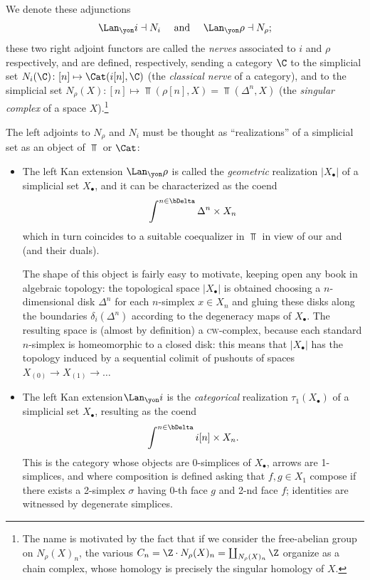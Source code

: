 We denote these adjunctions
\[
\Lan_\yon i\dashv N_i \quad\text{ and }\quad \Lan_\yon \rho\dashv N_\rho;
\] 
these two right adjoint functors are called the \emph{nerves} associated to $i$ and $\rho$ respectively, and are defined, respectively, sending a category $\C$ to the simplicial set $N_i(\C)\colon [n]\mapsto \Cat(i[n],\C)$ (the \emph{classical nerve} of a category), and to the simplicial set $N_\rho(X)\colon[n]\mapsto \Top(\rho[n], X) = \Top(\Delta^n, X)$ (the \emph{singular complex} of a space $X$).\footnote{The name is motivated by the fact that if we consider the free-abelian group on $N_\rho(X)_n$, the various $C_n = \Z\cdot N_\rho(X)_n = \coprod_{ N_\rho(X)_n}\Z$ organize as a chain complex, whose homology is precisely the singular homology of $X$.}

The left adjoints to $N_\rho$ and $N_i$ must be thought as ``realizations'' of a simplicial set as an object of $\Top$ or $\Cat$:
\begin{itemize}
\item The left Kan extension $\Lan_\yon \rho$ is called the \emph{geometric} realization $|X_\bullet|$ of a simplicial set $X_\bullet$, and it can be characterized as the coend
\[
\int^{n\in\bDelta} \Delta^n \times X_n
\]
which in turn coincides to a suitable coequalizer in $\Top$ in view of our  and  (and their duals). 

The shape of this object is fairly easy to motivate, keeping open any book in algebraic topology: the topological space $|X_\bullet|$ is obtained choosing a $n$-dimensional disk $\Delta^n$ for each $n$-simplex $x \in X_n$ and gluing these disks along the boundaries $\delta_i(\Delta^n)$ according to the degeneracy maps of $X_\bullet$. The resulting space is (almost by definition) a \textsc{cw}-complex, because each standard $n$-simplex is homeomorphic to a closed disk: this means that  $|X_\bullet|$ has the topology induced by a sequential colimit of pushouts of spaces $X_{(0)} \to X_{(1)} \to\dots$
\item The left Kan extension$\Lan_\yon i$ is the \emph{categorical} realization $\tau_1(X_\bullet)$ of a simplicial set $X_\bullet$, resulting as the coend
\[
\int^{n\in\bDelta} i[n] \times X_n.
\]
This is the category whose objects are 0-simplices of $X_\bullet$, arrows are 1-simplices, and where composition is defined asking that $f,g\in X_1$ compose if there exists a 2-simplex $\sigma$ having 0-th face $g$ and 2-nd face $f$; identities are witnessed by degenerate simplices.%
\end{itemize}
